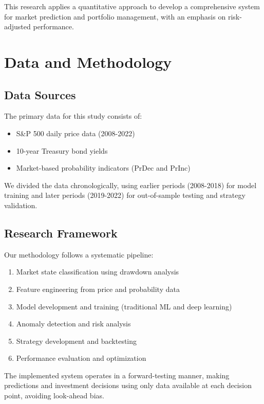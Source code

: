 \documentclass[10pt]{article}
\begin{document}
This research applies a quantitative approach to develop a comprehensive system for market prediction and portfolio management, with an emphasis on risk-adjusted performance.

\section{Data and Methodology}
\subsection{Data Sources}
The primary data for this study consists of:
\begin{itemize}
	\item S\&P 500 daily price data (2008-2022)
	\item 10-year Treasury bond yields
	\item Market-based probability indicators (PrDec and PrInc)
\end{itemize}

We divided the data chronologically, using earlier periods (2008-2018) for model training and later periods (2019-2022) for out-of-sample testing and strategy validation.

\subsection{Research Framework}
Our methodology follows a systematic pipeline:
\begin{enumerate}
	\item Market state classification using drawdown analysis
	\item Feature engineering from price and probability data
	\item Model development and training (traditional ML and deep learning)
	\item Anomaly detection and risk analysis
	\item Strategy development and backtesting
	\item Performance evaluation and optimization
\end{enumerate}

The implemented system operates in a forward-testing manner, making predictions and investment decisions using only data available at each decision point, avoiding look-ahead bias.
\end{document}
